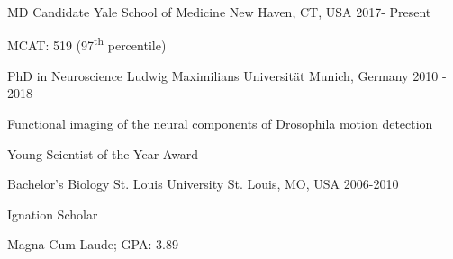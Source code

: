 


\begin{cventries}


\cventry
{MD Candidate} %
{Yale School of Medicine} %
{New Haven, CT, USA} %
{2017- Present} %
{ %
\begin{cvitems}
\item{MCAT: 519 (97\textsuperscript{th} percentile)}
\end{cvitems}
}


\cventry
{PhD in Neuroscience} %
{Ludwig Maximilians Universit{\"a}t} %
{Munich, Germany} %
{2010 - 2018} %
{ %
\begin{cvitems}
\item {Functional imaging of the neural components of Drosophila motion detection}
\item {Young Scientist of the Year Award}
\end{cvitems}
}



\cventry
{Bachelor's Biology} %
{St. Louis University} %
{St. Louis, MO, USA} %
{2006-2010} %
{ %
\begin{cvitems}
\item {Ignation Scholar}
\item {Magna Cum Laude; GPA: 3.89}
\end{cvitems}
}




\end{cventries}